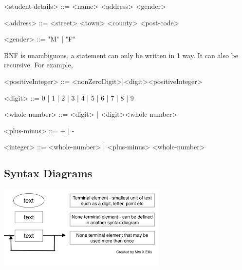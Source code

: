 \documentclass{article}
\begin{document}
\begin{grammar}
<student-details> ::= <name> <address> <gender>

<address> ::= <street> <town> <county> <post-code>

<gender> ::= "M" | "F"
\end{grammar}

BNF is unambiguous, a statement can only be written in 1 way.
It can also be recursive. For example,
\begin{grammar}
<positiveInteger> ::= <nonZeroDigit>|<digit><positiveInteger>
\end{grammar}


\begin{grammar}
<digit> ::= 0 | 1 | 2 | 3 | 4 | 5 | 6 | 7 | 8 | 9

<whole-number> ::= <digit> | <digit><whole-number>

<plus-minus> ::= + | -

<integer> ::= <whole-number> | <plus-minus> <whole-number>
\end{grammar}

\subsection{Syntax Diagrams}
\includegraphics{syntax diagramn.png}
\end{document}
